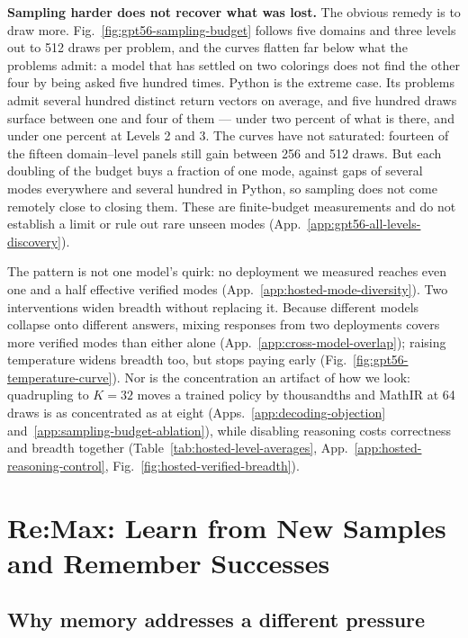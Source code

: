 \documentclass{article}
\newcommand{\1}{\mathbf 1}
\theoremstyle{remark}
\theoremstyle{definition}
\theoremstyle{plain}
\begin{document}
\textbf{Sampling harder does not recover what was lost.}
The obvious remedy is to draw more. Fig.~\ref{fig:gpt56-sampling-budget}
follows five domains and three levels out to 512 draws per problem, and the
curves flatten far below what the problems admit: a model that has settled on
two colorings does not find the other four by being asked five hundred times.
Python is the extreme case. Its problems admit several hundred distinct return
vectors on average, and five hundred draws surface between one and four of
them --- under two percent of what is there, and under one percent at
Levels 2 and 3. The curves have not saturated: fourteen of the fifteen
domain--level panels still gain between 256 and 512 draws. But each doubling of
the budget buys a fraction of one mode, against gaps of several modes
everywhere and several hundred in Python, so sampling does not come remotely
close to closing them. These are finite-budget measurements and do not
establish a limit or rule out rare unseen modes
(App.~\ref{app:gpt56-all-levels-discovery}).


The pattern is not one model's quirk: no deployment we measured reaches even
one and a half effective verified modes
(App.~\ref{app:hosted-mode-diversity}). Two interventions widen breadth without
replacing it. Because different models collapse onto different answers, mixing
responses from two deployments covers more verified modes than either alone
(App.~\ref{app:cross-model-overlap}); raising temperature widens breadth too,
but stops paying early (Fig.~\ref{fig:gpt56-temperature-curve}).
Nor is the concentration an artifact of how we look: quadrupling to $K=32$
moves a trained policy by thousandths and MathIR at 64 draws is as concentrated
as at eight (Apps.~\ref{app:decoding-objection}
and~\ref{app:sampling-budget-ablation}), while disabling reasoning costs
correctness and breadth together
(Table~\ref{tab:hosted-level-averages},
App.~\ref{app:hosted-reasoning-control},
Fig.~\ref{fig:hosted-verified-breadth}).

\section{Re:Max: Learn from New Samples and Remember Successes}
\label{sec:method}

\subsection{Why memory addresses a different pressure}
\label{sec:collapse-mechanism}
\end{document}

